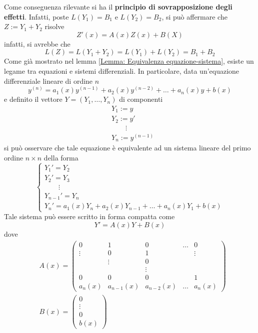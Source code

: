 Come conseguenza rilevante si ha il \textbf{principio di sovrapposizione degli effetti}. Infatti, poste $L(Y_1)=B_1$ e $L(Y_2)=B_2$, si può affermare che
$Z:=Y_1+Y_2$ risolve 
\begin{equation}
    Z'(x)=A(x)Z(x)+B(X)
\end{equation}
infatti, si avrebbe che
\begin{equation}
L(Z)=L(Y_1+Y_2)=L(Y_1)+L(Y_2)=B_1+B_2
\end{equation}
Come già mostrato nel lemma \ref{Lemma: Equivalenza equazione-sistema}, esiste un legame tra equazioni e sistemi differenziali. In particolare, data un'equazione differenziale lineare di ordine $n$
\begin{equation}
    y^{(n)}=a_1(x)y^{(n-1)}+a_2(x)y^{(n-2)}+ \dots+a_n(x)y+b(x)
\end{equation}
e definito il vettore $Y=(Y_1, \dots, Y_n)$ di componenti
\begin{equation}
\begin{aligned}
&Y_1:=y\\
&Y_2:=y'\\
&\qquad \vdots\\
&Y_n:=y^{(n-1)}
\end{aligned}
\end{equation}
si può osservare che tale equazione è equivalente ad un sistema lineare del primo ordine $n\times n$ della forma
\begin{equation}
    \begin{cases}
        Y_1'=Y_2\\
        Y_2'=Y_3\\
        \qquad\vdots\\
        Y_{n-1}'=Y_n\\
        Y_n'= a_1(x) Y_n+ a_2(x) Y_{n-1}+ \dots+ a_n(x) Y_1 + b(x)
    \end{cases}
\end{equation}
Tale sistema può essere scritto in forma compatta come \begin{equation}
Y'=A(x)Y+B(x)
\end{equation}
dove
\begin{align}
&A(x)=\begin{pmatrix}
    0 & 1 & 0 & \dots &  0\\
    \vdots & 0 & 1 & \,  &\vdots\\
    \, & \vdots & 0 & \,  &\,\\
    \, & \, & \vdots & \,  &\,\\
    0 & 0 & 0 & \,  & 1\\
    a_n(x) & a_{n-1}(x) & a_{n-2}(x) & \dots & a_n(x)
\end{pmatrix}\\
&B(x)= \begin{pmatrix}
    0\\
    \vdots\\
    0\\
    b(x)
\end{pmatrix}
\end{align}
